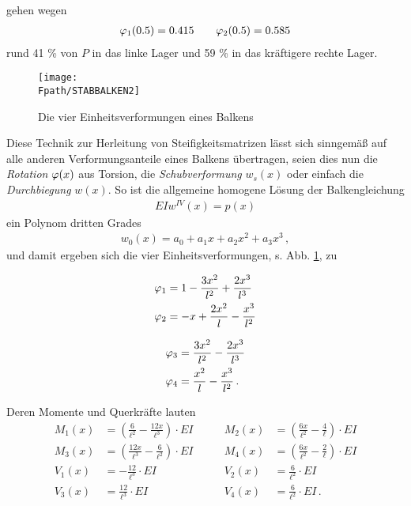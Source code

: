 gehen wegen
\begin{align}
 \varphi_1(0.5) = 0.415 \qquad{} \varphi_2(0.5) =
0.585
\end{align}
rund 41 \% von $P$ in das linke Lager und 59 \% in das kr\"{a}ftigere rechte Lager.
\begin{figure}[tbp] \centering
\if {} \sidecaption \fi
\texttt{[image: \\Fpath/STABBALKEN2]}
\caption{Die vier Einheitsverformungen eines Balkens}
\label{StabBalken2}%
\end{figure}%

Diese Technik zur Herleitung von Steifigkeitsmatrizen l\"{a}sst sich sinngem\"{a}{\ss} auf alle anderen Verformungsanteile eines Balkens \"{u}bertragen, seien dies nun die {\em Rotation} $\varphi(x)$ aus Torsion, die {\em Schubverformung} $w_s(x)$ oder einfach die {\em Durchbiegung\/} $w(x)$. So ist die allgemeine homogene L\"{o}sung der Balkengleichung
\begin{align}
EI w^{IV}(x) = p(x)
\end{align}
ein Polynom dritten Grades
\begin{align}
w_0(x) = a_0 + a_1 x + a_2 x^2 + a_3 x^3\,,
\end{align}
und damit ergeben sich die vier Einheitsverformungen, s. Abb. \ref{StabBalken2}, zu
\bfo\label{Phi1Bis4}
\parbox{5cm}{
\begin{align}
\varphi_1 &= 1 - \frac{3x^2}{l^2} + \frac{2x^3}{l^3} \nonumber \\
\varphi_2 &= - x + \frac{2x^2}{l} - \frac{x^3}{l^2} \nonumber
\end{align}
}
\parbox{5cm}{
\begin{align}
\varphi_3 &= \frac{3x^2}{l^2} - \frac{2x^3}{l^3}\nonumber \\
\varphi_4 &= \frac{x^2}{l} - \frac{x^3}{l^2}\,.\nonumber  \label{Einheitsverformungen}
\end{align}
}
\efo
Deren Momente und Querkr\"{a}fte lauten
\begin{subequations}\label{Eq219X}
\begin{alignat}{3}
M_1(x) &=   (\frac{6}{\ell^2} - \frac{12x}{\ell^3}) \cdot EI  &\qquad  M_2(x) &=  (\frac{6 x}{\ell^2}-\frac{4}{\ell}) \cdot EI \\
M_3(x) &= (\frac{12x}{\ell^3}-\frac{6}{\ell^2})\cdot EI &\qquad M_4(x) &= (\frac{6 x}{\ell^2}-\frac{2}{\ell})\cdot EI \\
V_1(x) &=   - \frac{12}{\ell^3} \cdot EI &\qquad V_2(x) &=  \frac{6}{\ell^2} \cdot EI \\
V_3(x) &=  \frac{12}{\ell^3}\cdot EI &\qquad  V_4(x) &= \frac{6 }{\ell^2}\cdot EI\,.
\end{alignat}
\end{subequations}
